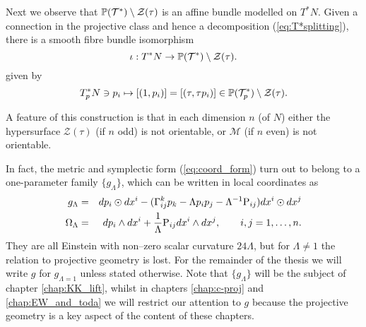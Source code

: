 \begin{rmk}
Next we observe that $\mathbb{P}(\mathcal{T}^*)\setminus \mathcal{Z}(\tau)$ is an affine bundle modelled on $T^* N$. Given a connection in the projective class and hence a decomposition (\ref{eq:T*splitting}), there is a smooth fibre bundle isomorphism
  \begin{equation}\label{key-id}
\iota : T^* N\to \mathbb{P}(\mathcal{T}^*)\setminus \mathcal{Z}(\tau).
    \end{equation}
%
given by
\begin{equation}
T_p^*N\ni p_i  \mapsto [(1,p_i)]=[(\tau,\tau p_i)]\in
\mathbb{P}(\mathcal{T}_p^*)\setminus \mathcal{Z}(\tau) .
\end{equation}
\end{rmk}

\begin{rmk}
A feature of this construction is that in each dimension $n$ (of $N$)
either the hypersurface $\mathcal{Z}(\tau)$ (if $n$ odd) is not
orientable, or $\mathcal{M}$ (if $n$ even) is not orientable.
\end{rmk} 

\begin{rmk}
In fact, the metric and symplectic form (\ref{eq:coord_form}) turn
out to belong to a one-parameter family $\{g_{\Lambda}\}$, which
can be written in local coordinates as 
\begin{eqnarray}
g_{\Lambda} & = &  dp_{i}\odot dx^{i}-(\Gamma_{ij}^{k}p_{k}-\Lambda p_{i}p_{j}-\Lambda^{-1}\mathrm{P}_{ij}) dx^{i}\odot dx^{j}\label{eq:general_g}\\
\Omega_{\Lambda} & = &  dp_{i}\wedge dx^{i}+\frac{1}{\Lambda}\mathrm{P}_{ij} dx^{i}\wedge dx^{j},\qquad i,j=1,\dots ,n.\label{eq:general_omega}
\end{eqnarray}
They are all Einstein with non--zero scalar curvature $24\Lambda$, but for $\Lambda\neq1$ the relation to projective geometry is lost. For the remainder of the thesis we will write $g$ for $g_{\Lambda=1}$ unless stated otherwise. Note that $\{g_\Lambda\}$ will be the subject of chapter \ref{chap:KK_lift}, whilst in chapters \ref{chap:c-proj} and \ref{chap:EW_and_toda} we will restrict our attention to $g$ because the projective geometry is a key aspect of the content of these chapters.
\end{rmk}


